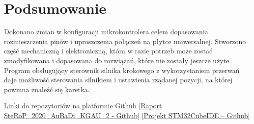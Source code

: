\documentclass[10pt, a4paper]{article}
\begin{document}
%
%
%
%



\section{Podsumowanie}

Dokonano zmian w konfiguracji mikrokontrolera celem dopasowania rozmieszczenia pinów i uproszczenia połączeń na płytce uniwersalnej. Stworzono część mechaniczną i elektroniczną, która w razie potrzeb może zostać zmodyfikowana i dopasowana do rozwiązań, które nie zostały jeszcze użyte. Program obsługujący sterownik silnika krokowego z wykorzystaniem przerwań daje możliwość sterowania silnikiem i ustawienia rządanej pozycji, na której powinna znaleźć się karetka.


\newline
\newline
Linki do repozytoriów na platformie Github
\newline
\href{https://github.com/kewingaluszka/SteRoP_2020_AuBaDi_KGAU_2}{[Raport SteRoP\_2020\_AuBaDi\_KGAU\_2 - Github]}
\newline
\href{https://github.com/kewingaluszka/AuBaDi}{[Projekt STM32CubeIDE -- Github]}
\end{document}
